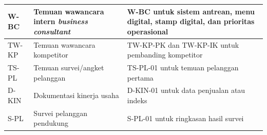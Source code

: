 \begin{table}[!htbp]
\begin{tabularx}{\textwidth}{|Z{2.2cm}|Y|Y|}
        W-BC & Temuan wawancara intern \textit{business consultant} & W-BC untuk sistem antrean, menu digital, stamp digital, dan prioritas operasional \\ \hline
        TW-KP & Temuan wawancara kompetitor & TW-KP-PK dan TW-KP-IK untuk pembanding kompetitor \\ \hline
        TS-PL & Temuan survei/angket pelanggan & TS-PL-01 untuk temuan pelanggan pertama \\ \hline
        D-KIN & Dokumentasi kinerja usaha & D-KIN-01 untuk data penjualan atau indeks \\ \hline
        S-PL & Survei pelanggan pendukung & S-PL-01 untuk ringkasan hasil survei \\ \hline
        \bottomrule
    \end{tabularx}
\end{table}

